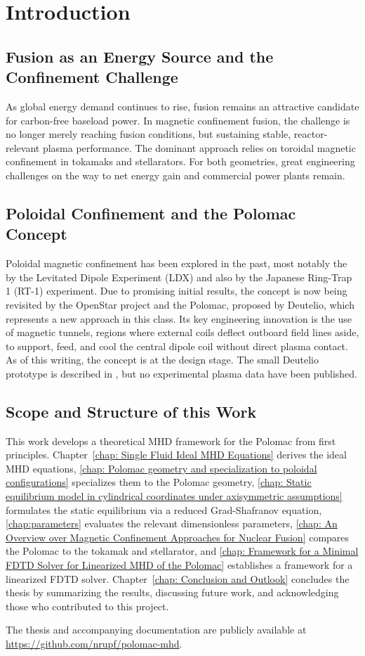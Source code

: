 \chapter{Introduction}

\section{Fusion as an Energy Source and the Confinement Challenge}

As global energy demand continues to rise, fusion remains an attractive candidate
for carbon-free baseload power. 
In magnetic confinement fusion, the challenge is no longer merely reaching fusion conditions, 
but sustaining stable, reactor-relevant plasma performance. 
The dominant approach relies on toroidal magnetic confinement in tokamaks and stellarators. 
For both geometries, great engineering challenges on the way to net energy gain and 
commercial power plants remain.

\section{Poloidal Confinement and the Polomac Concept}

Poloidal magnetic confinement has been explored in the past, most notably 
the by the Levitated Dipole Experiment (LDX) and also by the Japanese Ring-Trap 1 (RT-1) experiment.
Due to promising initial results, the concept is now being revisited 
by the OpenStar project and the Polomac, proposed by Deutelio, which represents 
a new approach in this class.
Its key engineering innovation is the use of magnetic tunnels,
regions where external coils deflect outboard field lines aside, to 
support, feed, and cool the central dipole coil without direct plasma contact. 
As of this writing, the concept is at the design stage. The small 
Deutelio prototype is described in \cite{Elio2024}, but no experimental 
plasma data have been published.

\section{Scope and Structure of this Work}

This work develops a theoretical MHD framework for the Polomac from first principles. 
Chapter~\ref{chap: Single Fluid Ideal MHD Equations} derives the ideal MHD equations, 
\autoref{chap: Polomac geometry and specialization to poloidal configurations} specializes them to the Polomac geometry, 
\autoref{chap: Static equilibrium model in cylindrical coordinates under axisymmetric assumptions} formulates the static equilibrium via a reduced Grad-Shafranov equation,
\autoref{chap:parameters} evaluates the relevant dimensionless parameters,
\autoref{chap: An Overview over Magnetic Confinement Approaches for Nuclear Fusion} compares the Polomac to the tokamak and stellarator, and
\autoref{chap: Framework for a Minimal FDTD Solver for Linearized MHD of the Polomac} establishes a framework for a linearized FDTD solver.
Chapter~\ref{chap: Conclusion and Outlook} concludes the thesis by summarizing the results, discussing future work, and acknowledging those who contributed to this project.

The thesis and accompanying documentation are publicly available at \url{https://github.com/nrupf/polomac-mhd}.